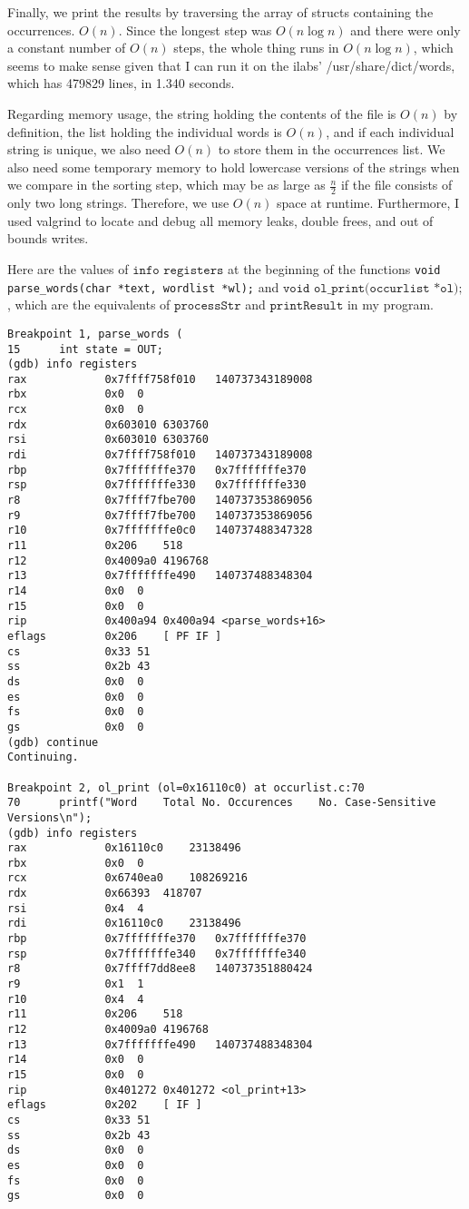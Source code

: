 \documentclass[11pt]{article}
\theoremstyle{quest}
\begin{document}
Finally, we print the results by traversing the array of structs containing the occurrences. $O(n)$. Since the longest step was $O(n\log n)$ and there were only a constant number of $O(n)$ steps, the whole thing runs in $O(n\log n)$, which seems to make sense given that I can run it on the ilabs' /usr/share/dict/words, which has 479829 lines, in 1.340 seconds.

Regarding memory usage, the string holding the contents of the file is $O(n)$ by definition, the list holding the individual words is $O(n)$, and if each individual string is unique, we also need $O(n)$ to store them in the occurrences list. We also need some temporary memory to hold lowercase versions of the strings when we compare in the sorting step, which may be as large as $\frac{n}{2}$ if the file consists of only two long strings. Therefore, we use $O(n)$ space at runtime. Furthermore, I used valgrind to locate and debug all memory leaks, double frees, and out of bounds writes.

Here are the values of $\texttt{info registers}$ at the beginning of the functions \texttt{void parse\_words\-(char *text, wordlist *wl);} and $\texttt{void ol\_print(occurlist *ol);}$, which are the equivalents of $\texttt{processStr}$ and $\texttt{printResult}$ in my program.

\begin{verbatim}
Breakpoint 1, parse_words (
15		int state = OUT;
(gdb) info registers
rax            0x7ffff758f010	140737343189008
rbx            0x0	0
rcx            0x0	0
rdx            0x603010	6303760
rsi            0x603010	6303760
rdi            0x7ffff758f010	140737343189008
rbp            0x7fffffffe370	0x7fffffffe370
rsp            0x7fffffffe330	0x7fffffffe330
r8             0x7ffff7fbe700	140737353869056
r9             0x7ffff7fbe700	140737353869056
r10            0x7fffffffe0c0	140737488347328
r11            0x206	518
r12            0x4009a0	4196768
r13            0x7fffffffe490	140737488348304
r14            0x0	0
r15            0x0	0
rip            0x400a94	0x400a94 <parse_words+16>
eflags         0x206	[ PF IF ]
cs             0x33	51
ss             0x2b	43
ds             0x0	0
es             0x0	0
fs             0x0	0
gs             0x0	0
(gdb) continue
Continuing.

Breakpoint 2, ol_print (ol=0x16110c0) at occurlist.c:70
70		printf("Word	Total No. Occurences	No. Case-Sensitive Versions\n");
(gdb) info registers
rax            0x16110c0	23138496
rbx            0x0	0
rcx            0x6740ea0	108269216
rdx            0x66393	418707
rsi            0x4	4
rdi            0x16110c0	23138496
rbp            0x7fffffffe370	0x7fffffffe370
rsp            0x7fffffffe340	0x7fffffffe340
r8             0x7ffff7dd8ee8	140737351880424
r9             0x1	1
r10            0x4	4
r11            0x206	518
r12            0x4009a0	4196768
r13            0x7fffffffe490	140737488348304
r14            0x0	0
r15            0x0	0
rip            0x401272	0x401272 <ol_print+13>
eflags         0x202	[ IF ]
cs             0x33	51
ss             0x2b	43
ds             0x0	0
es             0x0	0
fs             0x0	0
gs             0x0	0
\end{verbatim}
\end{document}
